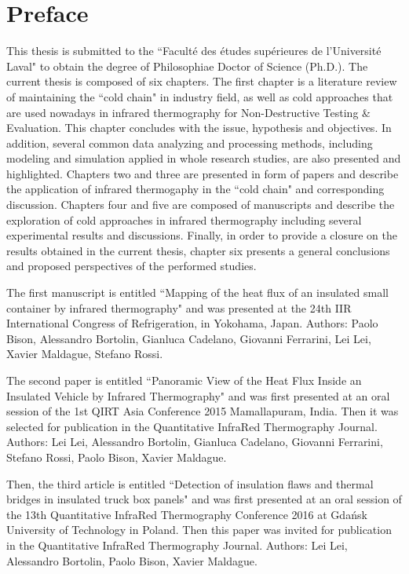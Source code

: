 \chapter*{Preface}         %

This thesis is submitted to the ``Faculté des études supérieures de l'Université Laval" to obtain the degree of Philosophiae Doctor of Science (Ph.D.). The current thesis is composed of six chapters. The first chapter is a literature review of maintaining the ``cold chain" in industry field, as well as cold approaches that are used nowadays in infrared thermography for Non-Destructive Testing \& Evaluation. This chapter concludes with the issue, hypothesis and objectives. In addition, several common data analyzing and processing methods, including modeling and simulation applied in whole research studies, are also presented and highlighted. Chapters two and three are presented in form of papers and describe the application of infrared thermogaphy in the ``cold chain" and corresponding discussion. Chapters four and five are composed of manuscripts and describe the exploration of cold approaches in infrared thermography including several experimental results and discussions. Finally, in order to provide a closure on the results obtained in the current thesis, chapter six presents a general conclusions and proposed perspectives of the performed studies.

The first manuscript is entitled ``Mapping of the heat flux of an insulated small container by infrared thermography" and was presented at the 24th IIR International Congress of Refrigeration, in Yokohama, Japan. Authors: Paolo Bison, Alessandro Bortolin, Gianluca Cadelano, Giovanni Ferrarini, Lei Lei, Xavier Maldague, Stefano Rossi.

The second paper is entitled ``Panoramic View of the Heat Flux Inside an Insulated Vehicle by Infrared Thermography" and was first presented at an oral session of the 1st QIRT Asia Conference 2015 Mamallapuram, India. Then it was selected for publication in the Quantitative InfraRed Thermography Journal. Authors: Lei Lei, Alessandro Bortolin, Gianluca Cadelano, Giovanni Ferrarini, Stefano Rossi, Paolo Bison, Xavier Maldague. 

Then, the third article is entitled ``Detection of insulation flaws and thermal bridges in insulated truck box panels" and was first presented at an oral session of the 13th Quantitative InfraRed Thermography Conference 2016 at Gdańsk University of Technology in Poland. Then this paper was invited for publication in the Quantitative InfraRed Thermography Journal. Authors: Lei Lei, Alessandro Bortolin, Paolo Bison, Xavier Maldague.

